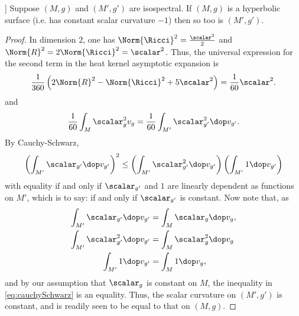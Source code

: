 \begin{proposition}[prop. E.IV.15 in]\cite{Berger.Gauduchon.Mazet-[SpectreVarieteRiemannienne]1971a}]
  Suppose  $(M,g)$ and $(M',g')$ are isospectral. If $(M,g)$ is  a hyperbolic surface (i.e. has constant scalar curvature $-1$)  then so too is $(M',g')$.
\end{proposition}
\begin{proof}
  In dimension $2$, one has $\Norm{\Ricci}^2 = \frac{\scalar^2}{2}$ and $\Norm{R}^2 = 2 \Norm{\Ricci}^2 = \scalar^2$. Thus, the universal expression for the second term in the heat kernel asymptotic expansion is
  \begin{align}
    \frac{1}{360}\left(2\Norm{R}^2 - \Norm{\Ricci}^2 + 5 \scalar^2\right) =\frac{1}{60} \scalar^2.
  \end{align}
  and
  \begin{align}
    \frac{1}{60} \int_M \scalar_{g}^2 v_g = \frac{1}{60} \int_{M'} \scalar_{g'}^2 \dop v_{g'}.
  \end{align}
  By Cauchy-Schwarz,
  \begin{align}\label{eq:cauchySchwarz}
    \left( \int_{M'} \scalar_{g'} \dop v_{g'} \right)^2 \leq \left( \int_{M'} \scalar_{g'}^2 \dop v_{g'} \right)\left( \int_{M'} 1 \dop v_{g'} \right)
  \end{align}
  with equality if and only if $\scalar_{g'}$ and $1$ are linearly dependent as functions on $M'$, which is to say: if and only if $\scalar_{g'}$ is constant. Now note that, as
  \begin{align}
    \int_{M'}\scalar_{g'}\dop v_{g'}   & =\int_{M}\scalar_{g}\dop v_{g},  \\
    \int_{M'}\scalar_{g'}^2\dop v_{g'} & =\int_{M}\scalar_{g}^2\dop v_{g} \\
    \int_{M'}1\dop v_{g'}              & =\int_{M}1\dop v_{g},
  \end{align}
  and by our assumption that $\scalar_g$ is constant on $M$, the inequality in \ref{eq:cauchySchwarz} is an equality. Thus, the scalar curvature on $(M',g')$ is constant, and is readily seen to be equal to that on $(M,g)$.
\end{proof}


\newpage



